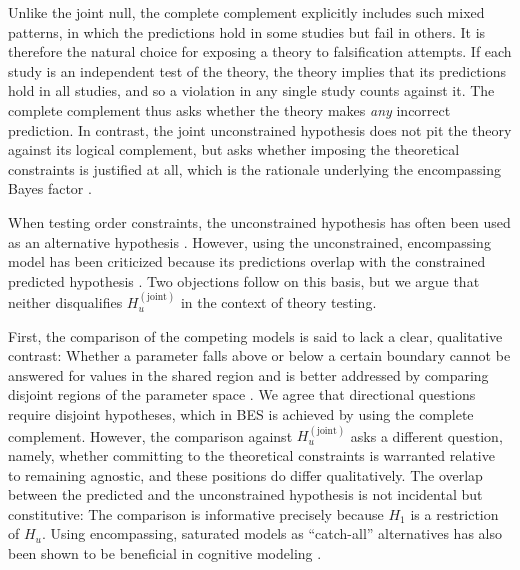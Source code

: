 \documentclass[letterpaper,11pt,oneside]{article}
\begin{document}
Unlike the joint null, the complete complement explicitly includes such mixed patterns, in which the predictions hold in some studies but fail in others. It is therefore the natural choice for exposing a theory to falsification attempts. If each study is an independent test of the theory, the theory implies that its predictions hold in all studies, and so a violation in any single study counts against it. The complete complement thus asks whether the theory makes \textit{any} incorrect prediction. In contrast, the joint unconstrained hypothesis does not pit the theory against its logical complement, but asks whether imposing the theoretical constraints is justified at all, which is the rationale underlying the encompassing Bayes factor \parencite{klugkistBayesFactorInequality2007, hoijtinkInformativeHypotheses2012}.

When testing order constraints, the unconstrained hypothesis has often been used as an alternative hypothesis \parencite[e.g.,][]{heckMultinomialModelsLinear2019, zwilling2019qtest, hoijtinkInformativeHypotheses2012}. However, using the unconstrained, encompassing model has been criticized because its predictions overlap with the constrained predicted hypothesis \parencite{shiffrinBayesFactorsRelations2016, chandramouliCommentaryGronauWagenmakers2019}. Two objections follow on this basis, but we argue that neither disqualifies $H_u^{(\text{joint})}$ in the context of theory testing.

First, the comparison of the competing models is said to lack a clear, qualitative contrast: Whether a parameter falls above or below a certain boundary cannot be answered for values in the shared region and is better addressed by comparing disjoint regions of the parameter space \parencite{shiffrinBayesFactorsRelations2016}. We agree that directional questions require disjoint hypotheses, which in BES is achieved by using the complete complement. However, the comparison against $H_u^{(\text{joint})}$ asks a different question, namely, whether committing to the theoretical constraints is warranted relative to remaining agnostic, and these positions do differ qualitatively. The overlap between the predicted and the unconstrained hypothesis is not incidental but constitutive: The comparison is informative precisely because $H_1$ is a restriction of $H_u$. Using encompassing, saturated models as ``catch-all'' alternatives has also been shown to be beneficial in cognitive modeling \parencite[e.g.,][]{heck2017information, lee2016bayesian}.
\end{document}
